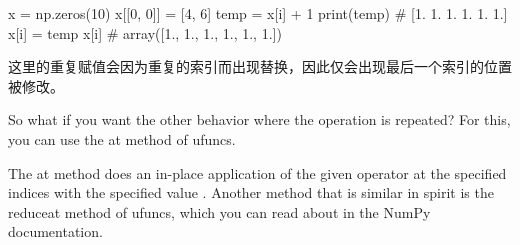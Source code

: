 \begin{pyc}
    x = np.zeros(10)
    x[[0, 0]] = [4, 6]
    temp = x[i] + 1
    print(temp) # [1. 1. 1. 1. 1. 1.]
    x[i] = temp
    x[i] # array([1., 1., 1., 1., 1., 1.])
\end{pyc}

这里的重复赋值会因为重复的索引而出现替换，因此仅会出现最后一个索引的位置被修改。

So what if you want the other behavior where the operation is repeated? For this, you
can use the at method of ufuncs.

The at method does an in-place application of the given operator at the specified indices with the specified value . Another method that is similar in
spirit is the reduceat method of ufuncs, which you can read about in the NumPy
documentation.



